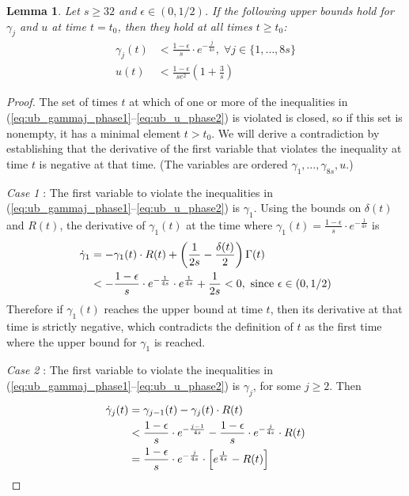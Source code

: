 \documentclass[a4paper,12pt]{article}
\newtheorem{lemma}{Lemma}
\begin{document}
\begin{lemma} \label{ub:u_gamma}
Let $s \geq 32$ and $\epsilon \in (0, 1/2)$. If the following upper bounds hold for $\gamma_j$ and $u$ at time $t = t_0$, then they hold at all times $t \geq t_0$:
\begin{align}
\label{eq:ub_gammaj_phase1} \gamma_j(t) & < \frac{1 - \epsilon}{s} \cdot e^{-\frac{j}{4s}}, \; \forall j \in \{1, \ldots, 8s \}  \\
\label{eq:ub_u_phase2} u(t) & < \frac{1 - \epsilon}{s  e^{2}}  \left(1 + \frac{3}{s}\right)
\end{align}
\end{lemma}
\begin{proof}
The set of times $t$ at which of one or more of the inequalities in (\ref{eq:ub_gammaj_phase1}--\ref{eq:ub_u_phase2}) is violated is closed, so if this set is nonempty, it has a minimal element $t>t_0$.  We will derive a contradiction by establishing that the derivative of the first variable that violates the inequality at time $t$ is negative at that time. (The variables are ordered $\gamma_1,\ldots,\gamma_{8s},u$.)
	
\medskip

\noindent \emph{Case 1} : The first variable to violate the inequalities in (\ref{eq:ub_gammaj_phase1}--\ref{eq:ub_u_phase2}) is $\gamma_1$.
Using the bounds on $\delta(t)$ and $R(t)$, the derivative of $\gamma_1(t)$ at the time where $\gamma_1(t) = \frac{1-\epsilon}{s} \cdot e^{-\frac{1}{4s}}$ is
\begin{align}
\dot{\gamma}_1 & = - \gamma_1(t) \cdot R(t) + \left( \frac{1}{2s} - \frac{\delta(t)}{2} \right) \Gamma(t) \notag \\
& < - \frac{1-\epsilon}{s} \cdot e^{-\frac{1}{4s}} \cdot e^{\frac{1}{4s}} + \frac{1}{2s} < 0, \mbox{ since } \epsilon \in (0, 1/2)
\end{align}
Therefore if $\gamma_1(t)$ reaches the upper bound at time $t$, then its derivative at that time is strictly negative, which contradicts the definition of $t$ as the first time where the upper bound for $\gamma_1$ is reached.

\medskip

\noindent \emph{Case 2} : The first variable to violate the inequalities in (\ref{eq:ub_gammaj_phase1}--\ref{eq:ub_u_phase2}) is $\gamma_j$, for some $j \geq 2$.
Then
\begin{align} \label{ub_gamma_j_case1}
\dot{\gamma}_j(t) & = \gamma_{j-1}(t) - \gamma_j(t) \cdot R(t) \notag \\
& < \frac{1-\epsilon}{s} \cdot e^{-\frac{j-1}{4s}} - \frac{1-\epsilon}{s} \cdot e^{-\frac{j}{4s}} \cdot R(t) \notag \\
& = \frac{1-\epsilon}{s} \cdot e^{-\frac{j}{4s}} \cdot \Bigl[ e^{\frac{1}{4s}} - R(t) \Bigr]
\end{align}


\end{proof}
\end{document}
